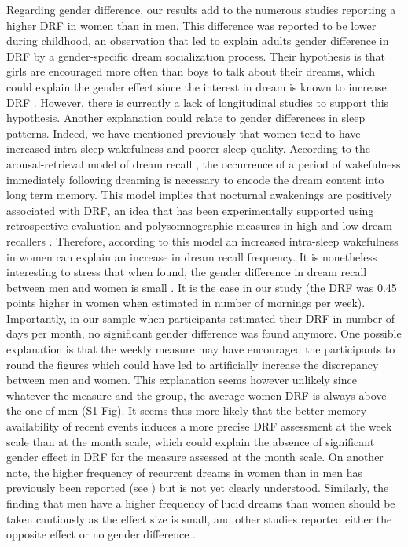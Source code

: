 Regarding gender difference, our results add to the numerous studies reporting a higher DRF in women than in men. This difference was reported to be lower during childhood, an observation that led \citep{schredl_gender_2008} to explain adults gender difference in DRF by a gender-specific dream socialization process. Their hypothesis is that girls are encouraged more often than boys to talk about their dreams, which could explain the gender effect since the interest in dream is known to increase DRF \citep{schredl_factors_2003}. However, there is currently a lack of longitudinal studies to support this hypothesis. Another explanation could relate to gender differences in sleep patterns. Indeed, we have mentioned previously that women tend to have increased intra-sleep wakefulness and poorer sleep quality. According to the arousal-retrieval model of dream recall \citep{koulack_dream_1976}, the occurrence of a period of wakefulness immediately following dreaming is necessary to encode the dream content into long term memory. This model implies that nocturnal awakenings are positively associated with DRF, an idea that has been experimentally supported using retrospective evaluation \citep{schredl_factors_2003} and polysomnographic measures in high and low dream recallers \citep{eichenlaub_brain_2014, vallat_increased_2017}. Therefore, according to this model an increased intra-sleep wakefulness in women can explain an increase in dream recall frequency. It is nonetheless interesting to stress that when found, the gender difference in dream recall between men and women is small \citep{schredl_gender_2008}. It is the case in our study (the DRF was 0.45 points higher in women when estimated in number of mornings per week). Importantly, in our sample when participants estimated their DRF in number of days per month, no significant gender difference was found anymore. One possible explanation is that the weekly measure may have encouraged the participants to round the figures which could have led to artificially increase the discrepancy between men and women. This explanation seems however unlikely since whatever the measure and the group, the average women DRF is always above the one of men (S1 Fig). It seems thus more likely that the better memory availability of recent events induces a more precise DRF assessment at the week scale than at the month scale, which could explain the absence of significant gender effect in DRF for the measure assessed at the month scale. On another note, the higher frequency of recurrent dreams in women than in men has previously been reported (see \citealp{zadra_recurrent_1996}) but is not yet clearly understood. Similarly, the finding that men have a higher frequency of lucid dreams than women should be taken cautiously as the effect size is small, and other studies reported either the opposite effect \citep{schredl_frequency_2011} or no gender difference \citep{schredl_lucid_2004, stepansky_austrian_1998}.

